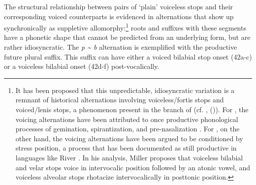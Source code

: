 
The structural relationship between pairs of ‘plain’ voiceless stops and their corresponding voiced counterparts is evidenced in alternations that show up synchronically as suppletive allomorphy:\footnote{It has been proposed that this unpredictable, idiosyncratic variation is a remnant of historical alternations involving voiceless/fortis stops and voiced/lenis stops, a phenomenon present in the  branch of  (cf.  \citet{sapir1930southern},  (\citealt{zigmond1991kawaiisu})). For , the voicing alternations have been attributed to once productive phonological processes of gemination, spirantization, and pre-nasalization \parencite{sapir1930southern}. For , on the other hand, the voicing alternations have been argued to be conditioned by stress position, a process that has been documented as still productive in languages like River  \citep[][52]{miller1996guarijio}. In his analysis, Miller proposes that voiceless bilabial and velar stops voice in intervocalic position followed by an atonic vowel, and voiceless alveolar stops rhotacize intervocalically in posttonic position.} roots and suffixes with these segments have a phonetic shape that cannot be predicted from an underlying form, but are rather idiosyncratic. The \textit{p {\textasciitilde} b} alternation is exemplified with the productive future plural suffix. This suffix can have either a voiced bilabial stop onset (42a-c) or a voiceless bilabial onset (42d-f) post-vocalically.








